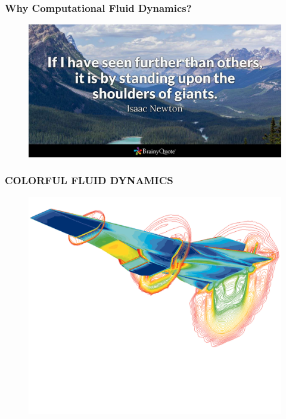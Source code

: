 \begin{frame}[fragile]
\frametitle{Why Computational Fluid Dynamics?}
\begin{figure}
\includegraphics[width=0.8\linewidth]{./image/isaacnewton1-2x}
\end{figure}
\end{frame}


\begin{frame}[fragile]
\frametitle{COLORFUL FLUID DYNAMICS }
\begin{figure}
\includegraphics[width=0.75\linewidth]{./image/hyperX-1}
\end{figure}
\end{frame}
